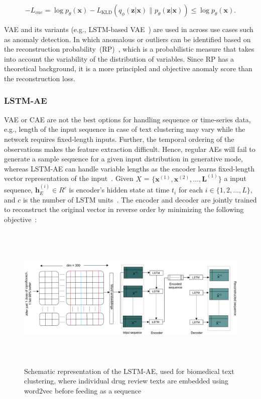 \begin{equation}
    -L_{vae}=\log p_{\theta}(\mathbf{x})-L_{\mathrm{KLD}}\left(q_{\phi}(\mathbf{z}|\mathbf{x}) \| p_{\theta}(\mathbf{z}|\mathbf{x})\right) \leq \log p_{\theta}(\mathbf{x}). 
    \label{eq:lvae}
\end{equation}

\hspace*{3.5mm} VAE and its variants (e.g., LSTM-based VAE~\cite{park2018multimodal}) are used in across use cases such as anomaly detection. In which anomalous or outliers can be identified based on the reconstruction probability~(RP)~\cite{an2015variational}, which is a probabilistic measure that takes into account the variability of the distribution of variables. Since RP has a theoretical background, it is a more principled and objective anomaly score than the reconstruction loss. 

\subsubsection{LSTM-AE}
VAE or CAE are not the best options for handling sequence or time-series data, e.g., length of the input sequence in case of text clustering may vary while the network requires fixed-length inputs. Further, the temporal ordering of the observations makes the feature extraction difficult. Hence, regular AEs will fail to generate a sample sequence for a given input distribution in generative mode, whereas LSTM-AE can handle variable lengths as the encoder learns fixed-length vector representation of the input~\cite{KarimNCCA2019,karim2019drug}. Given $X$ = $\{\mathbf{x}^{(1)},\mathbf{x}^{(2)}, ..., \mathbf{L}^{(1)}\}$ a input sequence, $\mathbf{h}_E^{(i)} \in {R}^c$ is encoder's hidden state at time $t_i$ for each $i \in \{1,2,...,L\}$, and $c$ is the number of LSTM units~\cite{LSTM_Autoencoder}. The encoder and decoder are jointly trained to reconstruct the original vector in reverse order by minimizing the following objective~\cite{zhu2018hidden}:  

\begin{figure}[h]
	\centering
	\includegraphics[width=\textwidth,height=70mm]{images/lstm_ae_v2.PNG}
    \caption{Schematic representation of the LSTM-AE, used for biomedical text clustering, where individual drug review texts are embedded using word2vec before feeding as a sequence~\cite{karimBIB2019}}	
	\label{fig:lstm_ae}
	\vspace{-2mm} 
\end{figure}

